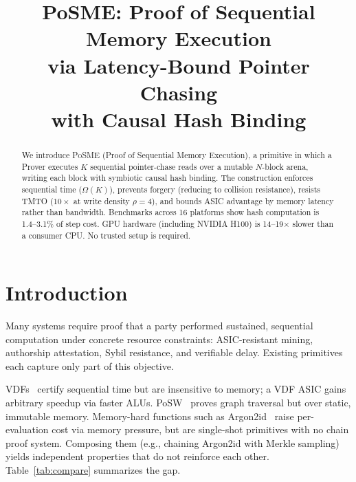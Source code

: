\documentclass[conference,twocolumn]{IEEEtran}
\newcommand{\posme}{\textsc{PoSME}}
\begin{document}
\title{PoSME: Proof of Sequential Memory Execution\\via Latency-Bound Pointer Chasing\\with Causal Hash Binding}

\author{
}

\maketitle

\begin{abstract}
We introduce \posme{} (Proof of Sequential Memory Execution), a
primitive in which a Prover executes $K$ sequential pointer-chase
reads over a mutable $N$-block arena, writing each block with
symbiotic causal hash binding. The construction enforces sequential
time ($\Omega(K)$), prevents forgery (reducing to collision
resistance), resists TMTO ($10{\times}$ at write density
$\rho{=}4$), and bounds ASIC advantage by memory latency rather
than bandwidth. Benchmarks across 16 platforms show hash
computation is 1.4--3.1\% of step cost. GPU hardware (including
NVIDIA H100) is 14--19$\times$ slower than a consumer CPU. No
trusted setup is required.
\end{abstract}

\section{Introduction}

Many systems require proof that a party performed sustained,
sequential computation under concrete resource constraints:
ASIC-resistant mining, authorship attestation, Sybil resistance,
and verifiable delay. Existing primitives each capture only part
of this objective.

VDFs~\cite{boneh2018vdf} certify sequential time but are
insensitive to memory; a VDF ASIC gains arbitrary speedup via
faster ALUs. PoSW~\cite{cohen2018posw} proves graph traversal
but over static, immutable memory. Memory-hard functions such as
Argon2id~\cite{biryukov2016} raise per-evaluation cost via memory
pressure, but are single-shot primitives with no chain proof
system. Composing them (e.g., chaining Argon2id with Merkle
sampling) yields independent properties that do not reinforce
each other. Table~\ref{tab:compare} summarizes the gap.
\end{document}
